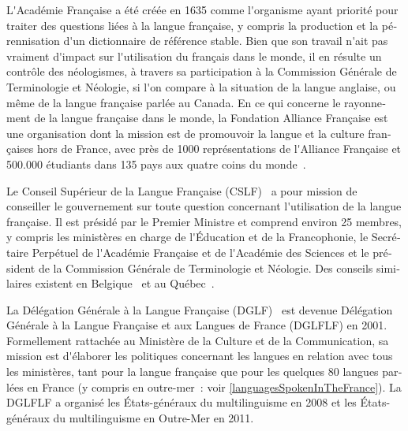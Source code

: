 \begin{french}
\begin{multicols}{2}
L{\mbox '}Académie Française a été créée en 1635 comme l{\mbox '}organisme ayant
priorité pour traiter des questions liées à la langue française, y
compris la production et la pérennisation d{\mbox '}un dictionnaire de référence stable. Bien que son
travail n{\mbox '}ait pas vraiment d{\mbox '}impact sur l{\mbox '}utilisation du français dans
le monde, il en résulte un contrôle des néologismes, à travers sa
participation à la Commission Générale de Terminologie et Néologie, si
l{\mbox '}on compare à la situation de la langue anglaise, ou même de la
langue française parlée au Canada. En ce qui concerne le rayonnement de la langue française dans le monde,
la Fondation Alliance Française est une organisation dont la mission est de promouvoir la langue et la
culture françaises hors de France, avec près de 1000 représentations
de l{\mbox '}Alliance Française et 500.000 étudiants dans 135 pays aux quatre coins du monde~\cite{monde}.

Le Conseil Supérieur de la Langue Française (CSLF)~\cite{cslf} a pour mission de
conseiller le gouvernement sur toute question concernant l{\mbox '}utilisation
de la langue française. Il est présidé par le Premier Ministre et
comprend environ 25 membres, y compris les ministères en charge de
l{\mbox '}Éducation et de la Francophonie, le Secrétaire Perpétuel de
l{\mbox '}Académie Française et de l{\mbox '}Académie des Sciences et le président de
la Commission Générale de Terminologie et Néologie. Des conseils
similaires existent en Belgique~\cite{belgique} et au Québec~\cite{quebec}.

La Délégation Générale à la Langue Française (DGLF)~\cite{dglf} est
devenue Délégation Générale à la Langue Française et aux Langues de
France (DGLFLF) en 2001. Formellement rattachée au Ministère de la
Culture et de la Communication, sa mission est d{\mbox '}élaborer les
politiques concernant les langues en relation avec tous les
ministères, tant pour la langue française que pour les quelques 80
langues parlées en France (y compris en outre-mer~: voir
\ref{languagesSpokenInTheFrance}). La DGLFLF a organisé les
États-généraux du multilinguisme en 2008 et les États-généraux du
multilinguisme en Outre-Mer en 2011.


\end{multicols}
\end{french}
